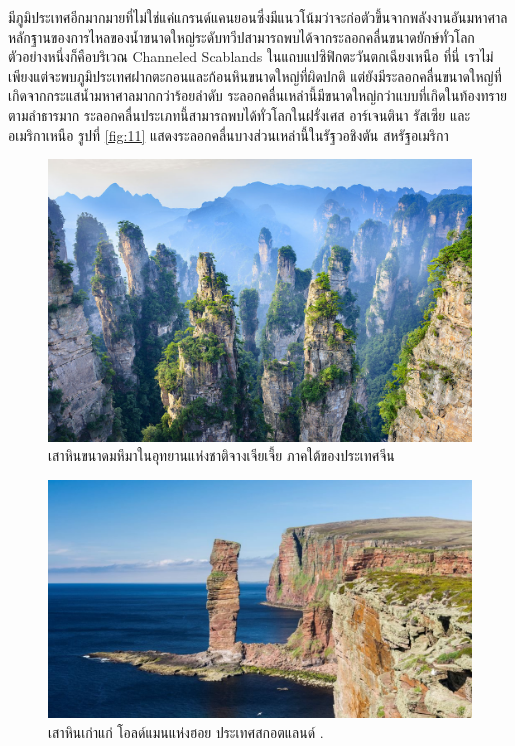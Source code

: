 \documentclass[10pt,twocolumn,letterpaper]{article}
\begin{document}
มีภูมิประเทศอีกมากมายที่ไม่ใช่แค่แกรนด์แคนยอนซึ่งมีแนวโน้มว่าจะก่อตัวขึ้นจากพลังงานอันมหาศาล หลักฐานของการไหลของน้ำขนาดใหญ่ระดับทวีปสามารถพบได้จากระลอกคลื่นขนาดยักษ์ทั่วโลก ตัวอย่างหนึ่งก็คือบริเวณ Channeled Scablands ในแถบแปซิฟิกตะวันตกเฉียงเหนือ ที่นี่ เราไม่เพียงแต่จะพบภูมิประเทศฝากตะกอนและก้อนหินขนาดใหญ่ที่ผิดปกติ แต่ยังมีระลอกคลื่นขนาดใหญ่ที่เกิดจากกระแสน้ำมหาศาลมากกว่าร้อยลำดับ \cite{78,79} ระลอกคลื่นเหล่านี้มีขนาดใหญ่กว่าแบบที่เกิดในท้องทรายตามลำธารมาก ระลอกคลื่นประเภทนี้สามารถพบได้ทั่วโลกในฝรั่งเศส อาร์เจนตินา รัสเซีย และอเมริกาเหนือ \cite{81} รูปที่ \ref{fig:11} แสดงระลอกคลื่นบางส่วนเหล่านี้ในรัฐวอชิงตัน สหรัฐอเมริกา \cite{80}

\begin{figure}[b]
\begin{center}
   \includegraphics[width=1\linewidth]{zhangjiajie.jpg}
\end{center}
   \caption{เสาหินขนาดมหึมาในอุทยานแห่งชาติจางเจียเจี้ย ภาคใต้ของประเทศจีน}
\label{fig:12}
\label{fig:onecol}
\end{figure}

\begin{figure}[b]
\begin{center}

   \includegraphics[width=1\linewidth]{hoy.jpg}
\end{center}
   \caption{เสาหินเก่าแก่ โอลด์แมนแห่งฮอย ประเทศสกอตแลนด์ \cite{83}.}
\label{fig:13}
\label{fig:onecol}
\end{figure}
\end{document}
